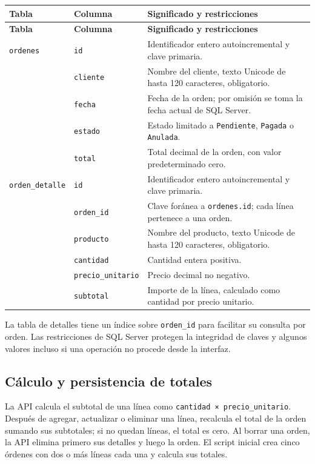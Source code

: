 \documentclass[11pt,a4paper]{article}
\begin{document}
\begin{longtable}{>{\raggedright\arraybackslash}p{} >{\raggedright\arraybackslash}p{} >{\raggedright\arraybackslash}p{}}
\toprule
\textbf{Tabla} & \textbf{Columna} & \textbf{Significado y restricciones}\\
\midrule
\endfirsthead
\toprule
\textbf{Tabla} & \textbf{Columna} & \textbf{Significado y restricciones}\\
\midrule
\endhead
\texttt{ordenes} & \texttt{id} & Identificador entero autoincremental y clave primaria.\\
& \texttt{cliente} & Nombre del cliente, texto Unicode de hasta 120 caracteres, obligatorio.\\
& \texttt{fecha} & Fecha de la orden; por omisión se toma la fecha actual de SQL Server.\\
& \texttt{estado} & Estado limitado a \texttt{Pendiente}, \texttt{Pagada} o \texttt{Anulada}.\\
& \texttt{total} & Total decimal de la orden, con valor predeterminado cero.\\
\midrule
\texttt{orden\_detalle} & \texttt{id} & Identificador entero autoincremental y clave primaria.\\
& \texttt{orden\_id} & Clave foránea a \texttt{ordenes.id}; cada línea pertenece a una orden.\\
& \texttt{producto} & Nombre del producto, texto Unicode de hasta 120 caracteres, obligatorio.\\
& \texttt{cantidad} & Cantidad entera positiva.\\
& \texttt{precio\_unitario} & Precio decimal no negativo.\\
& \texttt{subtotal} & Importe de la línea, calculado como cantidad por precio unitario.\\
\bottomrule
\end{longtable}

La tabla de detalles tiene un índice sobre \texttt{orden\_id} para facilitar su consulta por orden. Las restricciones de SQL Server protegen la integridad de claves y algunos valores incluso si una operación no procede desde la interfaz.

\subsection{Cálculo y persistencia de totales}

La API calcula el subtotal de una línea como \texttt{cantidad × precio\_unitario}. Después de agregar, actualizar o eliminar una línea, recalcula el total de la orden sumando sus subtotales; si no quedan líneas, el total es cero. Al borrar una orden, la API elimina primero sus detalles y luego la orden. El script inicial crea cinco órdenes con dos o más líneas cada una y calcula sus totales.
\end{document}
